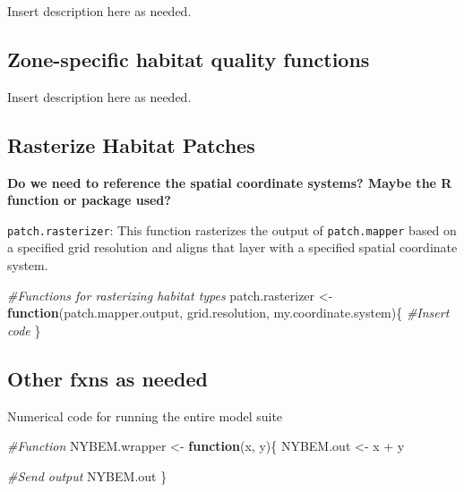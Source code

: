 \documentclass[
]{book}
\newenvironment{Shaded}{\begin{snugshade}}{\end{snugshade}}
\newcommand{\CommentTok}[1]{\textcolor[rgb]{0.56,0.35,0.01}{\textit{#1}}}
\newcommand{\ControlFlowTok}[1]{\textcolor[rgb]{0.13,0.29,0.53}{\textbf{#1}}}
\newcommand{\NormalTok}[1]{#1}
\newcommand{\OtherTok}[1]{\textcolor[rgb]{0.56,0.35,0.01}{#1}}
\newcommand{\SpecialCharTok}[1]{\textcolor[rgb]{0.00,0.00,0.00}{#1}}
\begin{document}
Insert description here as needed.

\hypertarget{zone-specific-habitat-quality-functions}{%
\subsection{Zone-specific habitat quality functions}\label{zone-specific-habitat-quality-functions}}

Insert description here as needed.

\hypertarget{rasterize-habitat-patches}{%
\subsection{Rasterize Habitat Patches}\label{rasterize-habitat-patches}}

\textbf{Do we need to reference the spatial coordinate systems? Maybe the R function or package used?}

\texttt{patch.rasterizer}: This function rasterizes the output of \texttt{patch.mapper} based on a specified grid resolution and aligns that layer with a specified spatial coordinate system.

\begin{Shaded}
\begin{Highlighting}[]
\CommentTok{\#Functions for rasterizing habitat types}
\NormalTok{patch.rasterizer }\OtherTok{\textless{}{-}} \ControlFlowTok{function}\NormalTok{(patch.mapper.output, grid.resolution, my.coordinate.system)\{}
  \CommentTok{\#Insert code}
\NormalTok{\}}
\end{Highlighting}
\end{Shaded}

\hypertarget{other-fxns-as-needed}{%
\subsection{Other fxns as needed}\label{other-fxns-as-needed}}

Numerical code for running the entire model suite

\begin{Shaded}
\begin{Highlighting}[]
\CommentTok{\#Function }
\NormalTok{NYBEM.wrapper }\OtherTok{\textless{}{-}} \ControlFlowTok{function}\NormalTok{(x, y)\{}
\NormalTok{  NYBEM.out }\OtherTok{\textless{}{-}}\NormalTok{ x }\SpecialCharTok{+}\NormalTok{ y}

  \CommentTok{\#Send output}
\NormalTok{  NYBEM.out}
\NormalTok{\}}
\end{Highlighting}
\end{Shaded}
\end{document}
